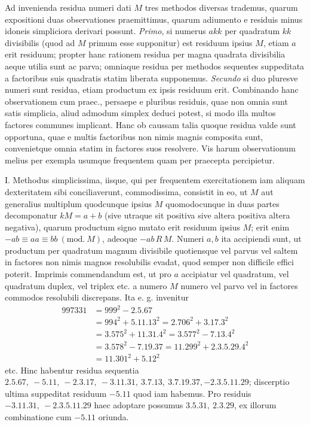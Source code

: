 Ad invenienda residua numeri dati \(M\) tres methodos diversas trademus, quarum expositioni duas observationes praemittimus, quarum adiumento e residuis minus idoneis simpliciora derivari possunt. \textit{Primo}, si numerus \(akk\) per quadratum \(kk\) divisibilis (quod ad \(M\) primum esse supponitur) est residuum ipsius \(M\), etiam \(a\) erit residuum; propter hanc rationem residua per magna
quadrata divisibilia aeque utilia sunt ac parva; omniaque residua per methodos sequentes suppeditata a factoribus suis quadratis statim liberata supponemus. \textit{Secundo} si duo pluresve numeri sunt residua, etiam productum ex ipsis residuum erit. Combinando hanc observationem cum praec., persaepe e pluribus residuis, quae non omnia sunt satis simplicia, aliud admodum simplex deduci potest, si modo illa multos factores communes implicant. Hanc ob caussam talia quoque residua valde sunt opportuna, quae e multis factoribus non nimis magnis composita sunt, convenietque omnia statim in factores suos resolvere. Vis harum observationum melius per exempla usumque frequentem quam per praecepta percipietur.

I. Methodus simplicissima, iisque, qui per frequentem exercitationem iam aliquam dexteritatem sibi conciliaverunt, commodissima, consistit in eo, ut \(M\) aut generalius multiplum quodcunque ipsius \(M\) quomodocunque in duas partes decomponatur \(kM=a+b\) (sive utraque sit positiva sive altera positiva altera negativa), quarum productum signo mutato erit residuum ipsius \(M\); erit enim \(-ab\equiv aa\equiv bb\ (\mathrm{mod.}\ M)\), adeoque \(-ab\,R\,M\). Numeri \(a,\allowbreak b\) ita accipiendi sunt, ut productum per quadratum magnum divisibile quotiensque vel parvus vel saltem in factores non nimis magnos resolubilis evadat, quod semper non difficile effici poterit. Imprimis commendandum est, ut pro \(a\) accipiatur vel quadratum, vel quadratum duplex, vel triplex etc. a numero \(M\) numero vel parvo vel in factores commodos resolubili discrepans. Ita e. g. invenitur \[\begin{aligned}
997331&=999^2-2.5.67\\
&=994^2+5.11.13^2=2.706^2+3.17.3^2\\
&=3.575^2+11.31.4^2=3.577^2-7.13.4^2\\
&=3.578^2-7.19.37=11.299^2+2.3.5.29.4^2\\
&=11.301^2+5.12^2
\end{aligned}\] etc. Hinc habentur residua sequentia \(2.5.67,\allowbreak \ -5.11,\allowbreak \ -2.3.17,\allowbreak \ -3.11.31,\allowbreak \ 3.7.13,\allowbreak \ 3.7.19.37,\allowbreak -2.3.5.11.29\); discerptio ultima suppeditat residuum \(-5.11\) quod iam habemus. Pro residuis \(-3.11.31,\allowbreak \ -2.3.5.11.29\) haec adoptare possumus \(3.5.31,\allowbreak \ 2.3.29\), ex illorum combinatione cum \(-5.11\) oriunda.

